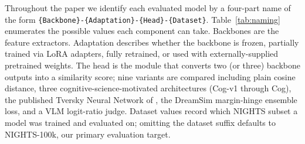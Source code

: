 \appendix
\clearpage

\vspace{1em}

Throughout the paper we identify each evaluated model by a four-part name of the form \texttt{\{Backbone\}-\{Adaptation\}-\{Head\}-\{Dataset\}}. Table~\ref{tab:naming} enumerates the possible values each component can take. Backbones are the feature extractors. Adaptation describes whether the backbone is frozen, partially trained via LoRA adapters, fully retrained, or used with externally-supplied pretrained weights. The head is the module that converts two (or three) backbone outputs into a similarity score; nine variants are compared including plain cosine distance, three cognitive-science-motivated architectures (Cog-v1 through Cog), the published Tversky Neural Network of \citet{doumbouya2025tversky}, the DreamSim margin-hinge ensemble loss, and a VLM logit-ratio judge. Dataset values record which NIGHTS subset a model was trained and evaluated on; omitting the dataset suffix defaults to NIGHTS-100k, our primary evaluation target.

